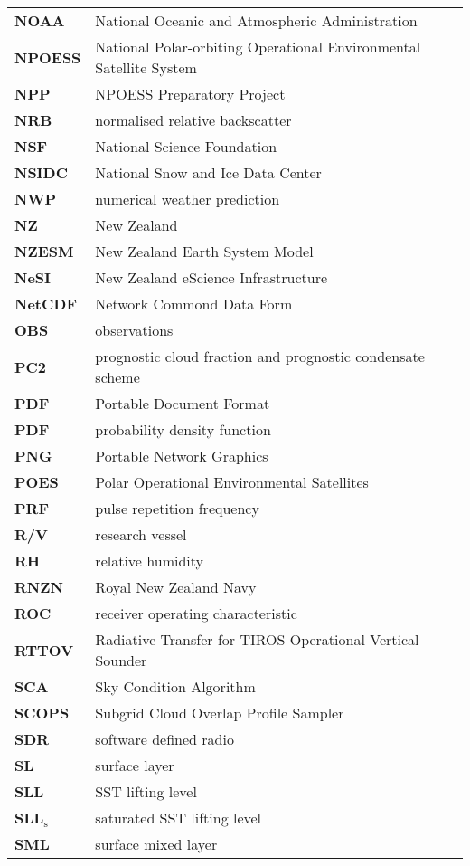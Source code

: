 \begin{longtable}{@{}p{2cm}p{20cm}}
\textbf{NOAA} & National Oceanic and Atmospheric Administration\\
\textbf{NPOESS} & National Polar-orbiting Operational Environmental Satellite
System\\
\textbf{NPP} & NPOESS Preparatory Project\\
\textbf{NRB} & normalised relative backscatter\\
\textbf{NSF} & National Science Foundation\\
\textbf{NSIDC} & National Snow and Ice Data Center\\
\textbf{NWP} & numerical weather prediction\\
\textbf{NZ} & New Zealand\\
\textbf{NZESM} & New Zealand Earth System Model\\
\textbf{NeSI} & New Zealand eScience Infrastructure\\
\textbf{NetCDF} & Network Commond Data Form\\
\textbf{OBS} & observations\\
\textbf{PC2} & prognostic cloud fraction and prognostic condensate scheme\\
\textbf{PDF} & Portable Document Format\\
\textbf{PDF} & probability density function\\
\textbf{PNG} & Portable Network Graphics\\
\textbf{POES} & Polar Operational Environmental Satellites\\
\textbf{PRF} & pulse repetition frequency\\
\textbf{R/V} & research vessel\\
\textbf{RH} & relative humidity\\
\textbf{RNZN} & Royal New Zealand Navy\\
\textbf{ROC} & receiver operating characteristic\\
\textbf{RTTOV} & Radiative Transfer for TIROS Operational Vertical Sounder\\
\textbf{SCA} & Sky Condition Algorithm\\
\textbf{SCOPS} & Subgrid Cloud Overlap Profile Sampler\\
\textbf{SDR} & software defined radio\\
\textbf{SL} & surface layer\\
\textbf{SLL} & SST lifting level\\
\textbf{SLL$\mathrm{_s}$} & saturated SST lifting level\\
\textbf{SML} & surface mixed layer\\

\end{longtable}
